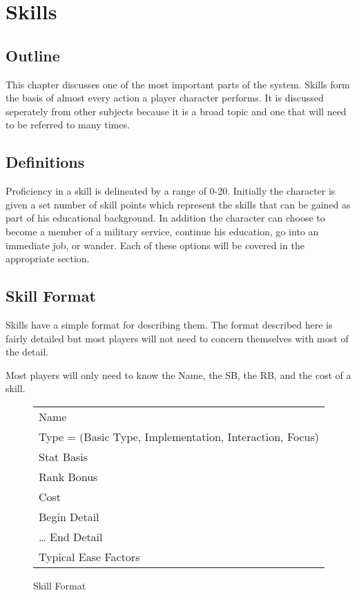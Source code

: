 \chapter{Skills}

\section{Outline}
This chapter discusses one of the most important parts of the system. 
Skills form the basis of almost every action a player character 
performs. It is discussed seperately from other subjects
because it is a broad topic and one that will need to be referred to 
many times.

\section{Definitions}
Proficiency in a skill is delineated by a range of 0-20. Initially 
the character is given a set number of skill points which represent 
the skills that can be gained as part of his educational background. 
In addition the character can choose to become a member of a military 
service, continue his education, go into an immediate job, or wander. 
Each of these options will be covered in the appropriate section.

\section{Skill Format}
Skills have a simple format for describing them. The format described 
here is fairly detailed but most players will not need to concern 
themselves with most of the detail. 

Most players will only need to know the Name, the SB, the RB, and the cost 
of a skill.

\begin{figure}[hb]
\centering
\caption{Skill Format}
	\begin{tabular}{|l|} \hline
	Name   \\
	Type = (Basic Type, Implementation, Interaction, Focus) \\
	Stat Basis \\
	Rank Bonus \\
	Cost \\
	Begin Detail \\
	\dots
	End Detail \\
	Typical Ease Factors \\ \hline
    \end{tabular}
\end{figure}

